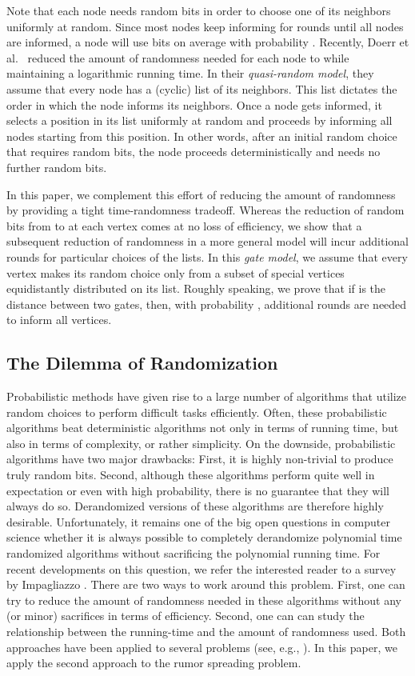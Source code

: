 \documentclass{article}
\begin{document}
Note that each node needs  random bits in order to choose one of its neighbors uniformly at random. Since most nodes keep informing for  rounds until all nodes are informed, a node will use  bits on average with probability . Recently, Doerr et al.~\cite{BC} reduced the amount of randomness needed for each node to  while maintaining a logarithmic running time. In their \textit{quasi-random model}, they assume that every node has a (cyclic) list of its neighbors. This list dictates the order in which the node informs its neighbors. Once a node  gets informed, it selects a position in its list uniformly at random and proceeds by informing all nodes starting from this position. In other words, after an initial random choice that requires  random bits, the node proceeds deterministically and needs no further random bits. 

In this paper, we complement this effort of reducing the amount of randomness by providing a tight time-randomness tradeoff. Whereas the reduction of random bits from  to  at each vertex comes at no loss of efficiency, we show that a subsequent reduction of randomness in a more general model will incur additional rounds for particular choices of the lists. In this \textit{gate model}, we assume that every vertex makes its random choice only from a subset of special vertices equidistantly distributed on its list. Roughly speaking, we prove that if  is the distance between two gates, then, with probability ,  additional rounds are needed to inform all vertices. 

\subsection{The Dilemma of Randomization}

Probabilistic methods have given rise to a large number of algorithms that utilize random choices to perform difficult tasks efficiently. Often, these probabilistic algorithms beat deterministic algorithms not only in terms of running time, but also in terms of complexity, or rather simplicity. On the downside, probabilistic algorithms have two major drawbacks: First, it is highly non-trivial to produce truly random bits. Second, although these algorithms perform quite well in expectation or even with high probability, there is no guarantee that they will always do so. Derandomized versions of these algorithms are therefore highly desirable. Unfortunately, it remains one of the big open questions in computer science whether it is always possible to completely derandomize polynomial time randomized algorithms without sacrificing the polynomial running time. For recent developments on this question, we refer the interested reader to a survey by Impagliazzo \cite{I07}. There are two ways to work around this problem. First, one can try to reduce the amount of randomness needed in these algorithms without any (or minor) sacrifices in terms of efficiency. Second, one can can study the relationship between the running-time and the amount of randomness used. Both approaches have been applied to several problems (see, e.g., \cite{B91,CG89,KR88,PU90,BC}). In this paper, we apply the second approach to the rumor spreading problem.  
\end{document}

